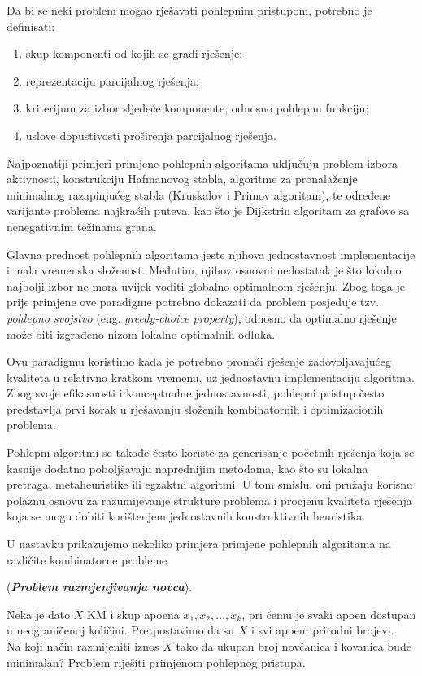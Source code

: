 Da bi se neki problem mogao rješavati pohlepnim pristupom, potrebno je definisati:

\begin{enumerate}
	\item skup komponenti od kojih se gradi rješenje;
	\item reprezentaciju parcijalnog rješenja;
	\item kriterijum za izbor sljedeće komponente, odnosno pohlepnu funkciju;
	\item uslove dopustivosti proširenja parcijalnog rješenja.
\end{enumerate}

Najpoznatiji primjeri primjene pohlepnih algoritama uključuju problem izbora aktivnosti, konstrukciju Hafmanovog stabla, algoritme za pronalaženje minimalnog razapinjućeg stabla (Kruskalov i Primov algoritam), te određene varijante problema najkraćih puteva, kao što je Dijkstrin algoritam za grafove sa nenegativnim težinama grana.

Glavna prednost pohlepnih algoritama jeste njihova jednostavnost implementacije i mala vremenska složenost. Međutim, njihov osnovni nedostatak je što lokalno najbolji izbor ne mora uvijek voditi globalno optimalnom rješenju. Zbog toga je prije primjene ove paradigme potrebno dokazati da problem posjeduje tzv. \emph{pohlepno svojstvo} (eng. \emph{greedy-choice property}), odnosno da optimalno rješenje može biti izgrađeno nizom lokalno optimalnih odluka.


Ovu paradigmu koristimo kada je potrebno pronaći rješenje zadovoljavajućeg kvaliteta u relativno kratkom vremenu, uz jednostavnu implementaciju algoritma. Zbog svoje efikasnosti i konceptualne jednostavnosti, pohlepni pristup često predstavlja prvi korak u rješavanju složenih kombinatornih i optimizacionih problema.

Pohlepni algoritmi se takođe često koriste za generisanje početnih rješenja koja se kasnije dodatno poboljšavaju naprednijim metodama, kao što su lokalna pretraga, metaheuristike ili egzaktni algoritmi. U tom smislu, oni pružaju korisnu polaznu osnovu za razumijevanje strukture problema i procjenu kvaliteta rješenja koja se mogu dobiti korištenjem jednostavnih konstruktivnih heuristika.

U nastavku prikazujemo nekoliko primjera primjene pohlepnih algoritama na različite kombinatorne probleme.

\begin{example}
	(\textbf{\emph{Problem razmjenjivanja novca}}).
	
	Neka je dato $X$ KM i skup apoena $x_1, x_2, \ldots, x_k$, pri čemu je svaki apoen dostupan u neograničenoj količini. Pretpostavimo da su $X$ i svi apoeni prirodni brojevi. \\
	
	
	Na koji način razmijeniti iznos $X$ tako da ukupan broj novčanica i kovanica bude minimalan? Problem riješiti primjenom pohlepnog pristupa.
\end{example}

